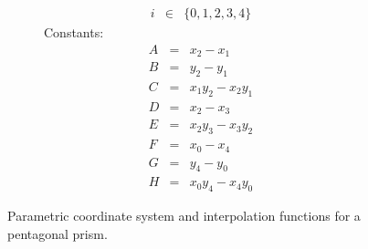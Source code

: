 \begin{description}
\begin{figure}[!htb]
\begin{subfigure}{0.48\linewidth}
\begin{equation*}
\begin{array}{lll}
            i &\in& \lbrace 0, 1, 2, 3, 4 \rbrace
            \end{array}
            \end{equation*}
            Constants:
            \begin{equation*}
            \begin{array}{lll}
            A &=& x_2 - x_1 \\
            B &=& y_2 - y_1 \\
            C &=& x_1 y_2 - x_2 y_1 \\
            D &=& x_2 - x_3 \\
            E &=& x_2 y_3 - x_3 y_2 \\
            F &=& x_0 - x_4 \\
            G &=& y_4 - y_0 \\
            H &=& x_0 y_4 - x_4 y_0
            \end{array}
            \end{equation*}
        \end{subfigure}%
        \caption{Parametric coordinate system and interpolation functions for a pentagonal prism.}
        \label{fig:Figure8-14}
    \end{figure}


\end{description}
